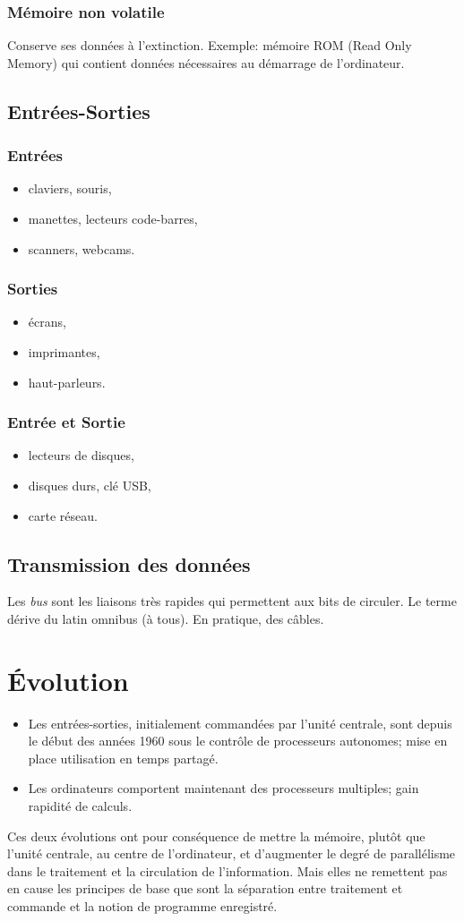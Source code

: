 \documentclass[a4paper,11pt]{article}
\begin{document}
\begin{Form}
\subsubsection{Mémoire non volatile}
Conserve ses données à l'extinction. Exemple: mémoire ROM (Read Only Memory) qui contient données nécessaires au démarrage de l'ordinateur.
\subsection{Entrées-Sorties}
\subsubsection{Entrées}
\begin{itemize}
\item claviers, souris,
\item manettes, lecteurs code-barres,
\item scanners, webcams.
\end{itemize}
\subsubsection{Sorties}
\begin{itemize}
\item écrans,
\item imprimantes,
\item haut-parleurs.
\end{itemize}
\subsubsection{Entrée et Sortie}
\begin{itemize}
\item lecteurs de disques,
\item disques durs, clé USB,
\item carte réseau.
\end{itemize}
\subsection{Transmission des données}
Les \emph{bus} sont les liaisons très rapides qui permettent aux bits de circuler. Le terme dérive du latin omnibus (à tous). En pratique, des câbles.
\section{Évolution}
\begin{itemize}
\item Les entrées-sorties, initialement commandées par l’unité centrale, sont depuis le début des années 1960 sous le contrôle de processeurs autonomes; mise en place utilisation en temps partagé.
\item Les ordinateurs comportent maintenant des processeurs multiples; gain rapidité de calculs.
\end{itemize}
Ces deux évolutions ont pour conséquence de mettre la mémoire, plutôt que l’unité centrale, au centre de
l’ordinateur, et d’augmenter le degré de parallélisme dans le traitement et la circulation de l’information.
Mais elles ne remettent pas en cause les principes de base que sont la séparation entre traitement et
commande et la notion de programme enregistré.

\end{Form}
\end{document}
